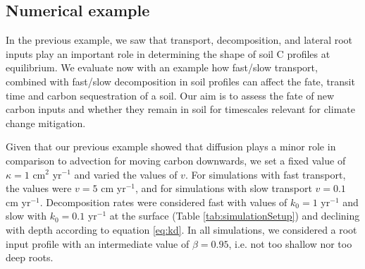 \documentclass[11pt, oneside, a4paper]{article}   	%
\begin{document}

\subsection{Numerical example}
In the previous example, we saw that transport, decomposition, and lateral root inputs play an important role in determining the shape of soil C profiles at equilibrium. We evaluate now with an example how fast/slow transport, combined with fast/slow decomposition in soil profiles can affect the fate, transit time and carbon sequestration of a soil. Our aim is to assess the fate of new carbon inputs and whether they remain in soil for timescales relevant for climate change mitigation.

Given that our previous example showed that diffusion plays a minor role in comparison to advection for moving carbon downwards, we set a fixed value of $\kappa = 1$ cm$^2$ yr$^{-1}$ and varied the values of $v$. For simulations with fast transport, the values were $v = 5$ cm yr$^{-1}$, and for simulations with slow transport $v = 0.1$ cm yr$^{-1}$. Decomposition rates were considered fast with values of $k_0 = 1$ yr$^{-1}$ and slow with $k_0 = 0.1$ yr$^{-1}$ at the surface (Table \ref{tab:simulationSetup}) and declining with depth according to equation \ref{eq:kd}. In all simulations, we considered a root input profile with an intermediate value of $\beta = 0.95$, i.e. not too shallow nor too deep roots. 
\end{document}
